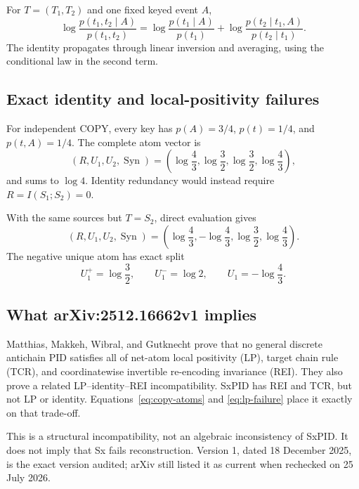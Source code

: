 \documentclass[11pt]{article}
\newcommand{\Syn}{\operatorname{Syn}}
\begin{document}
For $T=(T_1,T_2)$ and one fixed keyed event $A$,
\begin{equation}
\log\frac{p(t_1,t_2\mid A)}{p(t_1,t_2)}
=\log\frac{p(t_1\mid A)}{p(t_1)}
+\log\frac{p(t_2\mid t_1,A)}{p(t_2\mid t_1)}.
\label{eq:target-chain}
\end{equation}
The identity propagates through linear inversion and averaging, using the
conditional law in the second term.

\subsection{Exact identity and local-positivity failures}

For independent COPY, every key has $p(A)=3/4$, $p(t)=1/4$, and
$p(t,A)=1/4$.  The complete atom vector is
\begin{equation}
(R,U_1,U_2,\Syn)
=\left(\log\frac43,\log\frac32,\log\frac32,\log\frac43\right),
\label{eq:copy-atoms}
\end{equation}
and sums to $\log4$.  Identity redundancy would instead require
$R=I(S_1;S_2)=0$.

With the same sources but $T=S_2$, direct evaluation gives
\begin{equation}
(R,U_1,U_2,\Syn)
=\left(\log\frac43,-\log\frac43,\log\frac32,\log\frac43\right).
\label{eq:lp-failure}
\end{equation}
The negative unique atom has exact split
\begin{equation}
U_1^+=\log\frac32,
\qquad U_1^-=\log2,
\qquad U_1=-\log\frac43.
\label{eq:lp-components}
\end{equation}

\subsection{What arXiv:2512.16662v1 implies}

Matthias, Makkeh, Wibral, and Gutknecht prove that no general discrete
antichain PID satisfies all of net-atom local positivity (LP), target chain
rule (TCR), and coordinatewise invertible re-encoding invariance (REI).  They
also prove a related LP--identity--REI incompatibility.  SxPID has REI and TCR,
but not LP or identity.  Equations~\eqref{eq:copy-atoms} and
\eqref{eq:lp-failure} place it exactly on that trade-off.

This is a structural incompatibility, not an algebraic inconsistency of SxPID\@.
It does not imply that Sx fails reconstruction.  Version 1, dated 18 December
2025, is the exact version audited; arXiv still listed it as current when
rechecked on 25 July 2026.
\end{document}
